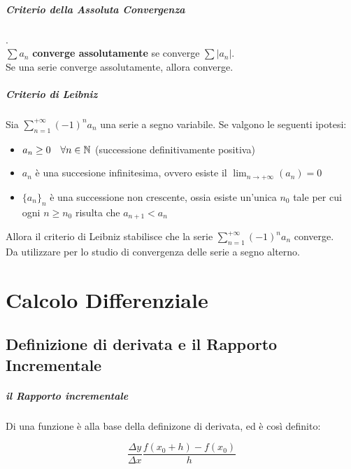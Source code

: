 \documentclass[12pt, a4paper, openany]{book}
\begin{document}
\paragraph{Criterio della Assoluta Convergenza}.\\
$\sum a_n$ \textbf{converge assolutamente} se converge $\sum |a_n|$.\\
Se una serie converge assolutamente, allora converge.

\paragraph{Criterio di Leibniz}
Sia $\sum^{+\infty}_{n=1}(-1)^n a_n$ una serie a segno variabile.
Se valgono le seguenti ipotesi:
\begin{itemize}
	\item $a_n \geq 0 \quad \forall n \in \mathbb{N}$ (successione definitivamente positiva)
	\item $a_n$ è una succesione infinitesima, ovvero esiste il $\lim_{n \rightarrow +\infty}(a_n) = 0$
	\item $\{a_n\}_n$ è una successione non crescente, ossia esiste un'unica $n_0$ tale per cui
	ogni $n \geq n_0$ risulta che $a_{n+1} < a_n$
\end{itemize}
Allora il criterio di Leibniz stabilisce che la serie $\sum^{+\infty}_{n=1}(-1)^n a_n$ converge.\\
Da utilizzare per lo studio di convergenza delle serie a segno alterno.


\chapter{Calcolo Differenziale}



\section{Definizione di derivata e il Rapporto Incrementale}
\paragraph*{il Rapporto incrementale} Di una funzione è alla base della definizone di derivata, ed è così definito:

\[ 
	\frac{\Delta y}{ \Delta x}\frac{f(x_0+h)-f(x_0)}{h} 
\]
\end{document}
